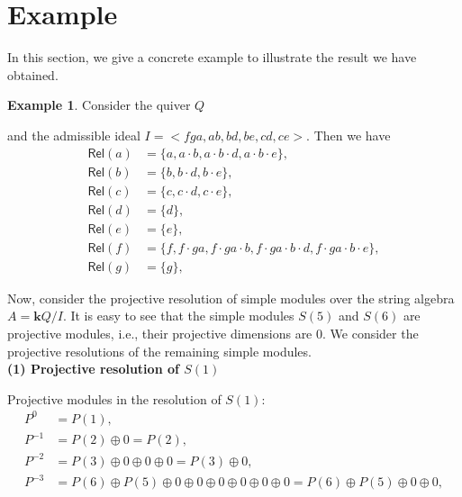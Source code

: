 \documentclass[11pt]{amsart}
\numberwithin{equation}{section}
\theoremstyle{definition}
\newtheorem{example}[theorem]{Example}
\begin{document}
\section{Example}

In this section, we give a concrete example to illustrate the result we have obtained.

\begin{example}

Consider the quiver $Q$
	\begin{center}
	\end{center}
	and the admissible ideal $I = <fga, ab, bd, be, cd, ce>$.  Then we have
	\[
	\begin{aligned}
		\mathsf{Rel}(a) &= \{a, a \cdot b, a \cdot b \cdot d, a \cdot b \cdot e\}, \\
		\mathsf{Rel}(b) &= \{b, b \cdot d, b \cdot e\}, \\
		\mathsf{Rel}(c) &= \{c, c \cdot d, c \cdot e\}, \\
		\mathsf{Rel}(d) &= \{d\}, \\
		\mathsf{Rel}(e) &= \{e\}, \\
		\mathsf{Rel}(f) &= \{f, f \cdot ga, f \cdot ga \cdot b, f \cdot ga \cdot b \cdot d, f \cdot ga \cdot b \cdot e\}, \\
		\mathsf{Rel}(g) &= \{g\},
	\end{aligned}
	\]
	
	Now, consider the projective resolution of simple modules over the string algebra \( A = \mathbf{k}Q/I \). It is easy to see that the simple modules \( S(5) \) and \( S(6) \) are projective modules, i.e., their projective dimensions are 0. We consider the projective resolutions of the remaining simple modules.\\
	\textbf{(1)  Projective resolution of \( S(1) \)}
	
	Projective modules in the resolution of \( S(1) \):
	\[
	\begin{aligned}
		P^0    &=  P(1), \\
		P^{-1} &=  P(2) \oplus 0 = P(2), \\
		P^{-2} &=  P(3) \oplus 0 \oplus 0 \oplus 0 = P(3) \oplus 0, \\
		P^{-3} &=  P(6) \oplus P(5) \oplus 0 \oplus 0 \oplus 0 \oplus 0 \oplus 0 \oplus 0  = P(6) \oplus P(5) \oplus 0 \oplus 0, 
	\end{aligned}
	\]
	

\end{example}
\end{document}
